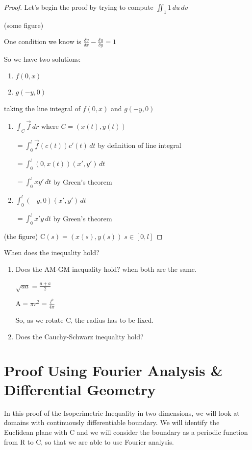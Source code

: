 \documentclass[a4paper]{book}
\numberwithin{theorem}{section}%
\begin{document}
\begin{proof}
	Let's begin the proof by trying to compute $\iint_{1} 1 \,du\,dv$

	(some figure)

	One condition we know is $\frac{\delta v}{\delta x}-\frac{\delta u}{\delta y}=1$
	
	So we have two solutions:
	\begin{enumerate}
		\item $f(0,x)$
		\item $g(-y,0)$
	\end{enumerate}
	
	taking the line integral of $f(0,x)$ and $g(-y,0)$
	\begin{enumerate}
		\item
			$\int_{C} \overrightarrow{f} \,dr$ \;\;\;where\; $C=(x(t),y(t))$
				
			$= \int_{0}^{l} \overrightarrow{f}(c(t))c'(t) \,dt$ \;\;\;by definition of line integral

			$= \int_{0}^{l} (0,x(t))(x',y') \,dt$
			
			$= \int_{0}^{l} xy' \,dt$ \;\;\;by Green's theorem
		\item
			$\int_{0}^{l} (-y,0)(x',y') \,dt$
			
			$= \int_{0}^{l} x'y \,dt$ \;\;\;by Green's theorem
	\end{enumerate}

	(the figure)
    $\mathrm{C}(s)=(x(s),y(s))\;s\in[0,l]$
\end{proof}

When does the inequality hold?
\begin{enumerate}
    \item Does the AM-GM inequality hold? when both are the same.
    \begin{center}
        $\sqrt{aa}=\frac{a+a}{2}$

        $\mathrm{A}=\pi r^{2}=\frac{l^{2}}{4\pi}$
    \end{center}

    So, as we rotate $\mathrm{C}$, the radius has to be fixed.

    \item Does the Cauchy-Schwarz inequality hold?
\end{enumerate}

\section{Proof Using Fourier Analysis {\&} Differential Geometry}
In this proof of the Isoperimetric Inequality in two dimensions, we will look at domains
with continuously differentiable boundary. We will identify the Euclidean plane with $\mathrm{C}$
and we will consider the boundary as a periodic function from $\mathrm{R}$ to $\mathrm{C}$, so that we are able
to use Fourier analysis. 
\end{document}
